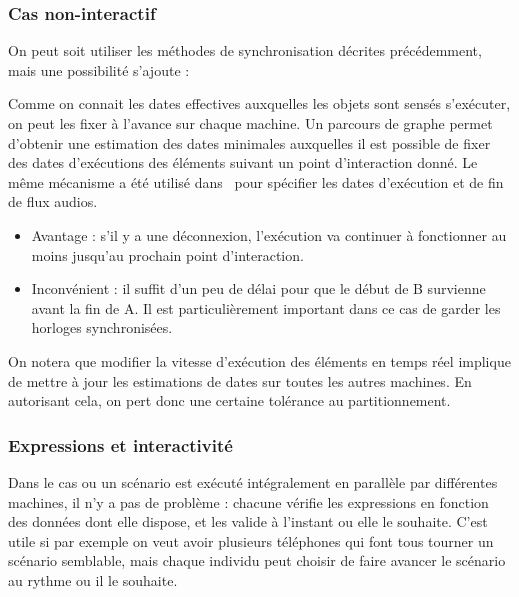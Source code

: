 \documentclass{article}
\newcommand\trigger{point d'interaction\xspace}
\begin{document}
\subsubsection{Cas non-interactif}
On peut soit utiliser les méthodes de synchronisation décrites précédemment, mais une possibilité s'ajoute : 

Comme on connait les dates effectives auxquelles les objets sont sensés s'exécuter, on peut les fixer à l'avance sur chaque machine. 
Un parcours de graphe permet d'obtenir une estimation des dates minimales auxquelles il est possible de fixer des dates d'exécutions des éléments suivant un point d'interaction donné.
Le même mécanisme a été utilisé dans~\cite{celerier2016rethinking} pour spécifier les dates d'exécution et de fin de flux audios.


\begin{itemize}
\item Avantage : s'il y a une déconnexion, l'exécution va continuer à fonctionner au moins jusqu'au prochain \trigger.
\item Inconvénient : il suffit d'un peu de délai pour que le début de B survienne avant la fin de A. 
Il est particulièrement important dans ce cas de garder les horloges synchronisées.
\end{itemize}

On notera que modifier la vitesse d'exécution des éléments en temps réel implique de mettre à jour les estimations de dates sur toutes les autres machines. 
En autorisant cela, on pert donc une certaine tolérance au partitionnement.

\begin{figure}[h]
	\centering
	\begin{tikzpicture}
	
	\end{tikzpicture}
	\label{scenar.non-interactif}
\end{figure}


\subsubsection{Expressions et interactivité}
Dans le cas ou un scénario est exécuté intégralement en parallèle par différentes machines, il n'y a pas de problème : chacune vérifie les expressions en fonction des données dont elle dispose, et les valide à l'instant ou elle le souhaite. C'est utile si par exemple on veut avoir plusieurs téléphones qui font tous tourner un scénario semblable, mais chaque individu peut choisir de faire avancer le scénario au rythme ou il le souhaite.
\end{document}
